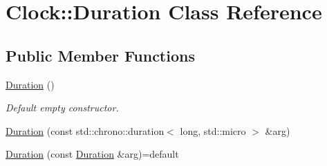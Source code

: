 \hypertarget{class_clock_1_1_duration}{}\section{Clock\+:\+:Duration Class Reference}
\label{class_clock_1_1_duration}
\subsection*{Public Member Functions}
\begin{DoxyCompactItemize}
\item 
\hyperlink{class_clock_1_1_duration_a88c346b0ca4555b84ea38acb7c6e7a51}{Duration} ()\hypertarget{class_clock_1_1_duration_a88c346b0ca4555b84ea38acb7c6e7a51}{}\label{class_clock_1_1_duration_a88c346b0ca4555b84ea38acb7c6e7a51}

\begin{DoxyCompactList}\small\item\em Default empty constructor. \end{DoxyCompactList}\item 
\hyperlink{class_clock_1_1_duration_a4d25fcf2509674b1b3730f6328a71d3e}{Duration} (const std\+::chrono\+::duration$<$ long, std\+::micro $>$ \&arg)
\item 
\hyperlink{class_clock_1_1_duration_aa5a9a80d7d943cd54b0f89bdb6c9af8c}{Duration} (const \hyperlink{class_clock_1_1_duration}{Duration} \&arg)=default\hypertarget{class_clock_1_1_duration_aa5a9a80d7d943cd54b0f89bdb6c9af8c}{}\label{class_clock_1_1_duration_aa5a9a80d7d943cd54b0f89bdb6c9af8c}


\end{DoxyCompactItemize}
